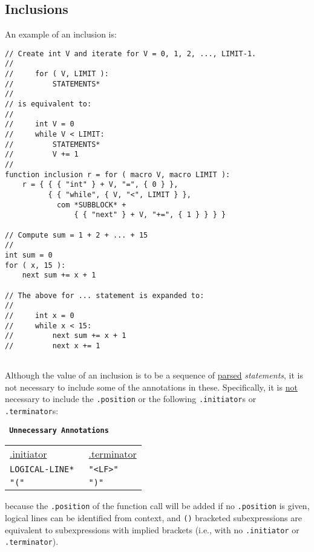 \documentclass[12pt]{article}
\newenvironment{indpar}[1][0.3in]%
	{\begin{list}{}%
		     {\setlength{\itemsep}{0in}%
		      \setlength{\topsep}{0in}%
		      \setlength{\parsep}{1ex}%
		      \setlength{\labelwidth}{#1}%
		      \setlength{\leftmargin}{#1}%
		      \addtolength{\leftmargin}{\labelsep}}%
	 \item}%
	{\end{list}}
\begin{document}
\subsection{Inclusions}
\label{INCLUSIONS}

An example of an inclusion is:
\begin{indpar}[1em]\begin{verbatim}
// Create int V and iterate for V = 0, 1, 2, ..., LIMIT-1.
//
//     for ( V, LIMIT ):
//         STATEMENTS*
//
// is equivalent to:
//
//     int V = 0
//     while V < LIMIT:
//         STATEMENTS*
//         V += 1
//
function inclusion r = for ( macro V, macro LIMIT ):
    r = { { { "int" } + V, "=", { 0 } },
          { { "while", { V, "<", LIMIT } },
            com *SUBBLOCK* +
                { { "next" } + V, "+=", { 1 } } } }

// Compute sum = 1 + 2 + ... + 15
//
int sum = 0
for ( x, 15 ):
    next sum += x + 1

// The above for ... statement is expanded to:
//
//     int x = 0
//     while x < 15:
//         next sum += x + 1
//         next x += 1
    
\end{verbatim}\end{indpar}

Although the value of an inclusion is to be a sequence of
\underline{parsed} {\em statements}, it is not necessary to
include some of the annotations in these.
Specifically, it is \underline{not} necessary to
include the {\tt .position} or
the following {\tt .initiator}s or {\tt .terminator}s:

\begin{center} \tt
{\rm \bf Unnecessary Annotations}\label{UNNECESSARY-ANNOTATIONS}
\\[1ex]
\begin{tabular}{l@{~~~~~~~~~~}l}
\underline{.initiator} & \underline{.terminator}
\\[1ex]
\tt *LOGICAL-LINE* & \tt "<LF>" \\
\tt "(" & \tt ")" \\
\end{tabular}
\end{center}

because the {\tt .position} of the function call will be added
if no {\tt .position} is given,
logical lines can be identified from context, and
{\tt ()} bracketed subexpressions are equivalent to
subexpressions with implied brackets (i.e., with no
{\tt .initiator} or {\tt .terminator}).
\end{document}
